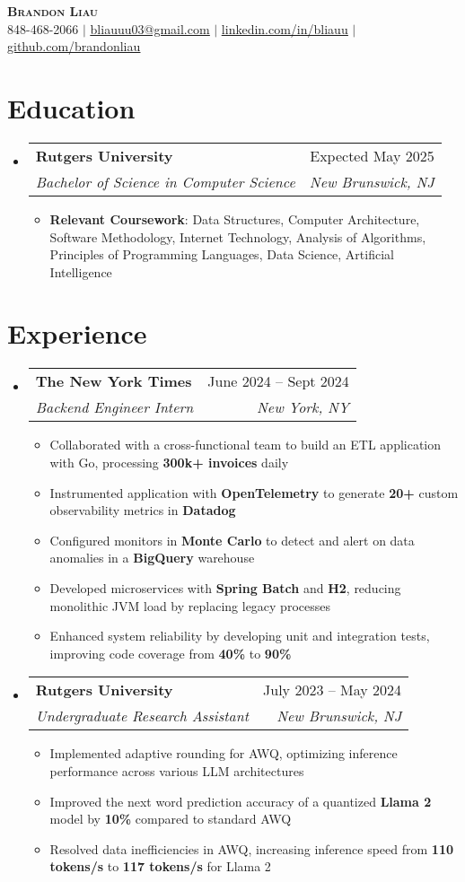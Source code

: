 \documentclass[letterpaper,11pt]{article}
\makeatletter
\newcommand{\resumeItem}[1]{
  \item\small{
    {#1 \vspace{-2pt}}
  }
}
\newcommand{\resumeSubheading}[4]{
  \vspace{-2pt}\item
    \begin{tabular*}{0.97\textwidth}[t]{l@{\extracolsep{\fill}}r}
      \textbf{#1} & #2 \\
      \textit{\small#3} & \textit{\small #4} \\
    \end{tabular*}\vspace{-7pt}
}
\newcommand{\resumeSubHeadingListStart}{\begin{itemize}[leftmargin=0.15in, label={}]}
\newcommand{\resumeSubHeadingListEnd}{\end{itemize}}
\newcommand{\resumeItemListStart}{\begin{itemize}}
\newcommand{\resumeItemListEnd}{\end{itemize}\vspace{-3pt}}
\makeatother
\begin{document}
\begin{center}
    \textbf{\Huge \scshape Brandon Liau} \\ \vspace{8pt}
    \small {} 848-468-2066 $|$ 
    \href{mailto:x@x.com}{ \underline{bliauuu03@gmail.com}} $|$ 
    \href{https://linkedin.com/in/bliauu}{ \underline{linkedin.com/in/bliauu}} $|$
    \href{https://github.com/brandonliau}{ \underline{github.com/brandonliau}}
\end{center}


\section{Education}
  \resumeSubHeadingListStart
    \resumeSubheading
      {Rutgers University}{Expected May 2025}
      {Bachelor of Science in Computer Science}{New Brunswick, NJ}
      \resumeItemListStart
        \resumeItem{\textbf{Relevant Coursework}: Data Structures, Computer Architecture, Software Methodology, Internet Technology, Analysis of Algorithms, Principles of Programming Languages, Data Science, Artificial Intelligence}
      \resumeItemListEnd
  \resumeSubHeadingListEnd


\section{Experience}
  \resumeSubHeadingListStart
    \resumeSubheading
      {The New York Times}{June 2024 -- Sept 2024}
      {Backend Engineer Intern}{New York, NY}
      \resumeItemListStart
        \resumeItem{Collaborated with a cross-functional team to build an ETL application with Go, processing \textbf{300k+ invoices} daily}
        \resumeItem{Instrumented application with \textbf{OpenTelemetry} to generate \textbf{20+} custom observability metrics in \textbf{Datadog}}
        \resumeItem{Configured monitors in \textbf{Monte Carlo} to detect and alert on data anomalies in a \textbf{BigQuery} warehouse}
        \resumeItem{Developed microservices with \textbf{Spring Batch} and \textbf{H2}, reducing monolithic JVM load by replacing legacy processes}
        \resumeItem{Enhanced system reliability by developing unit and integration tests, improving code coverage from \textbf{40\%} to \textbf{90\%}}
      \resumeItemListEnd
    \resumeSubheading
      {Rutgers University}{July 2023 -- May 2024}
      {Undergraduate Research Assistant}{New Brunswick, NJ}
      \resumeItemListStart
        \resumeItem{Implemented adaptive rounding for AWQ, optimizing inference performance across various LLM architectures}
        \resumeItem{Improved the next word prediction accuracy of a quantized \textbf{Llama 2} model by \textbf{10\%} compared to standard AWQ}
        \resumeItem{Resolved data inefficiencies in AWQ, increasing inference speed from \textbf{110 tokens/s} to \textbf{117 tokens/s} for Llama 2}
      \resumeItemListEnd
  \resumeSubHeadingListEnd
\end{document}
